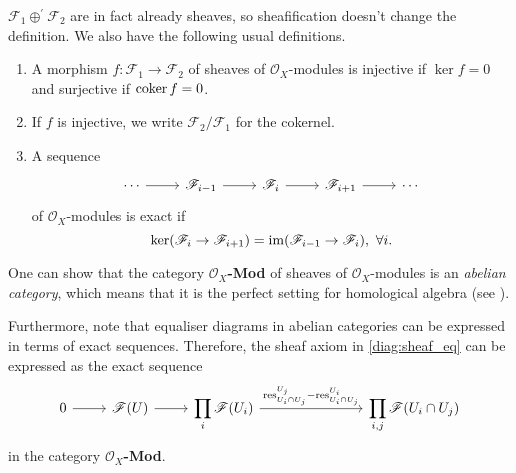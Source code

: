 $\mathscr{F}_{1}\oplus^{\prime}\mathscr{F}_{2}$ are in fact already sheaves,
so sheafification doesn't change the definition. We also have the following
usual definitions.
\begin{defin}\hfill

  \begin{enumerate}
    \item A morphism $f:\mathscr{F}_{1}\to\mathscr{F}_{2}$ of sheaves of
          $\mathscr{O}_{X}$-modules is injective if $\ker f = 0$ and
          surjective if $\operatorname{coker} f = 0$.
    \item If $f$ is injective, we write $\mathscr{F}_{2}/\mathscr{F}_{1}$
          for the cokernel.
    \item A sequence
          \[\begin{tikzcd}
              \cdots\rar & \mathscr{F}_{i-1}\rar & \mathscr{F}_{i}\rar
              & \mathscr{F}_{i+1}\rar & \cdots
            \end{tikzcd}\]
          of $\mathscr{O}_{X}$-modules is exact if
          \[
          \ker(\mathscr{F}_{i}\to\mathscr{F}_{i+1})=\operatorname{im}(\mathscr{F}_{i-1}
          \to\mathscr{F}_{i}),\ \forall i.
          \]
  \end{enumerate}

\end{defin}
\begin{cat}
  One can show that the category $\mathscr{O}_{X}$\textbf{-Mod} of sheaves
  of $\mathscr{O}_{X}$-modules is an \emph{abelian category}, which means
  that it is the perfect setting for homological algebra (see \cite{vakil}).

  Furthermore, note that equaliser diagrams in abelian categories can be
  expressed in terms of exact sequences. Therefore, the sheaf axiom in
  \eqref{diag:sheaf_eq} can be expressed as the exact sequence
  \begin{equation}\label{diag:sheaf_ex}\begin{tikzcd}
      0\rar & \mathscr{F}(U)\rar & \displaystyle\prod_{i}\mathscr{F}(U_{i})
      \rar{\text{res}_{U_{i}\cap U_{j}}^{U_{j}}-\text{res}_{U_{i}\cap U_{j}}^{ U_{i}}}
      &[5em] \displaystyle\prod_{i,j}\mathscr{F}(U_{i}\cap U_{j})
    \end{tikzcd}\end{equation}
  in the category $\mathscr{O}_{X}$\textbf{-Mod}.
\end{cat}

